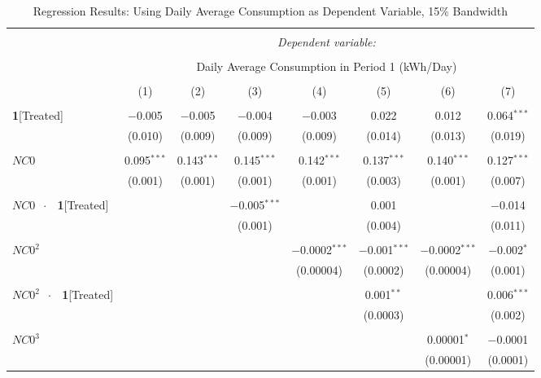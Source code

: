 \begin{table}[!htbp]
\centering 
\caption{Regression Results: Using Daily Average Consumption as Dependent Variable, 15\% Bandwidth}
\label{Table:Regression-Results_Daily-Average_15P-BW} 
\small 
\begin{adjustbox}{scale = 0.65}
\begin{tabular}{@{\extracolsep{50pt}}lccccccc} 
\\[-1.8ex]\hline 
\hline \\[-1.8ex] 
 & \multicolumn{7}{c}{\textit{Dependent variable:}} \\ 
\cline{2-8} 
\\[-1.8ex] & \multicolumn{7}{c}{Daily Average Consumption in Period 1 (kWh/Day)} \\ 
\\[-1.8ex] & (1) & (2) & (3) & (4) & (5) & (6) & (7)\\ 
\hline \\[-1.8ex] 
 \textbf{1}[Treated] & $-$0.005 & $-$0.005 & $-$0.004 & $-$0.003 & 0.022 & 0.012 & 0.064$^{***}$ \\ 
  & (0.010) & (0.009) & (0.009) & (0.009) & (0.014) & (0.013) & (0.019) \\ 
  & & & & & & & \\ 
 $NC0$ & 0.095$^{***}$ & 0.143$^{***}$ & 0.145$^{***}$ & 0.142$^{***}$ & 0.137$^{***}$ & 0.140$^{***}$ & 0.127$^{***}$ \\ 
  & (0.001) & (0.001) & (0.001) & (0.001) & (0.003) & (0.001) & (0.007) \\ 
  & & & & & & & \\ 
 $NC0$ $\ \cdot \ \ $ \textbf{1}[Treated] &  &  & $-$0.005$^{***}$ &  & 0.001 &  & $-$0.014 \\ 
  &  &  & (0.001) &  & (0.004) &  & (0.011) \\ 
  & & & & & & & \\ 
 $NC0^{2}$ &  &  &  & $-$0.0002$^{***}$ & $-$0.001$^{***}$ & $-$0.0002$^{***}$ & $-$0.002$^{*}$ \\ 
  &  &  &  & (0.00004) & (0.0002) & (0.00004) & (0.001) \\ 
  & & & & & & & \\ 
 $NC0^{2}$ $\ \cdot \ \ $ \textbf{1}[Treated] &  &  &  &  & 0.001$^{**}$ &  & 0.006$^{***}$ \\ 
  &  &  &  &  & (0.0003) &  & (0.002) \\ 
  & & & & & & & \\ 
 $NC0^{3}$ &  &  &  &  &  & 0.00001$^{*}$ & $-$0.0001 \\ 
  &  &  &  &  &  & (0.00001) & (0.0001) \\ 

\end{tabular}
\end{adjustbox}
\end{table}
